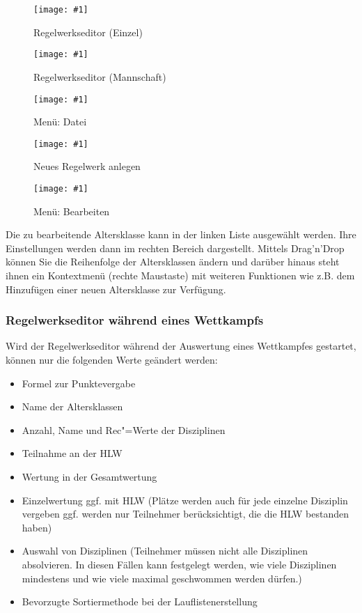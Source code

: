 \documentclass[11pt,a4paper,twoside,ngerman]{article}
\newcommand{\hsmimage}[3]{\begin{figure}[!ht]\centering\texttt{[image: \#1]}\caption{#3}\end{figure}}
\begin{document}
\hsmimage{pics/aks-einzel}{.80\textwidth}{Regelwerkseditor (Einzel)}

\hsmimage{pics/aks-mannschaft}{.80\textwidth}{Regelwerkseditor (Mannschaft)}

\hsmimage{pics/aks-datei}{.20\textwidth}{Menü: Datei}

\hsmimage{pics/aks-neu}{.56\textwidth}{Neues Regelwerk anlegen}

\hsmimage{pics/aks-bearbeiten}{.16\textwidth}{Menü: Bearbeiten}
Die zu bearbeitende Altersklasse kann in der linken Liste ausgewählt werden. Ihre Einstellungen werden dann im rechten Bereich dargestellt. Mittels Drag'n'Drop können Sie die Reihenfolge der Altersklassen ändern und darüber hinaus steht ihnen ein Kontextmenü (rechte Maustaste) mit weiteren Funktionen wie z.B. dem Hinzufügen einer neuen Altersklasse zur Verfügung.


\subsubsection*{Regelwerkseditor während eines Wettkampfs}
Wird der Regelwerkseditor während der Auswertung eines Wettkampfes gestartet, können nur die folgenden Werte geändert werden:


\begin{itemize}

\item Formel zur Punktevergabe


\item Name der Altersklassen


\item Anzahl, Name und Rec"=Werte der Disziplinen


\item Teilnahme an der HLW


\item Wertung in der Gesamtwertung


\item Einzelwertung ggf. mit HLW (Plätze werden auch für jede einzelne Disziplin vergeben ggf. werden nur Teilnehmer berücksichtigt, die die HLW bestanden haben)


\item Auswahl von Disziplinen (Teilnehmer müssen nicht alle Disziplinen absolvieren. In diesen Fällen kann festgelegt werden, wie viele Disziplinen mindestens und wie viele maximal geschwommen werden dürfen.)


\item Bevorzugte Sortiermethode bei der Lauflistenerstellung


\end{itemize}
\end{document}
